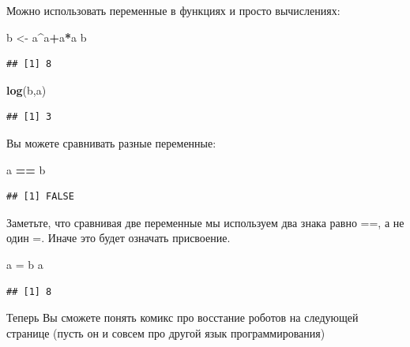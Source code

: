 \documentclass[]{book}
\newenvironment{Shaded}{\begin{snugshade}}{\end{snugshade}}
\newcommand{\KeywordTok}[1]{\textcolor[rgb]{0.13,0.29,0.53}{\textbf{#1}}}
\newcommand{\NormalTok}[1]{#1}
\newcommand{\OperatorTok}[1]{\textcolor[rgb]{0.81,0.36,0.00}{\textbf{#1}}}
\newcommand{\StringTok}[1]{\textcolor[rgb]{0.31,0.60,0.02}{#1}}
\begin{document}
Можно использовать переменные в функциях и просто вычислениях:

\begin{Shaded}
\begin{Highlighting}[]
\NormalTok{b <-}\StringTok{ }\NormalTok{a}\OperatorTok{^}\NormalTok{a}\OperatorTok{+}\NormalTok{a}\OperatorTok{*}\NormalTok{a}
\NormalTok{b}
\end{Highlighting}
\end{Shaded}

\begin{verbatim}
## [1] 8
\end{verbatim}

\begin{Shaded}
\begin{Highlighting}[]
\KeywordTok{log}\NormalTok{(b,a)}
\end{Highlighting}
\end{Shaded}

\begin{verbatim}
## [1] 3
\end{verbatim}

Вы можете сравнивать разные переменные:

\begin{Shaded}
\begin{Highlighting}[]
\NormalTok{a }\OperatorTok{==}\StringTok{ }\NormalTok{b}
\end{Highlighting}
\end{Shaded}

\begin{verbatim}
## [1] FALSE
\end{verbatim}

Заметьте, что сравнивая две переменные мы используем два знака равно ==, а не один =. Иначе это будет означать присвоение.

\begin{Shaded}
\begin{Highlighting}[]
\NormalTok{a =}\StringTok{ }\NormalTok{b}
\NormalTok{a}
\end{Highlighting}
\end{Shaded}

\begin{verbatim}
## [1] 8
\end{verbatim}

Теперь Вы сможете понять комикс про восстание роботов на следующей странице (пусть он и совсем про другой язык программирования)
\end{document}
